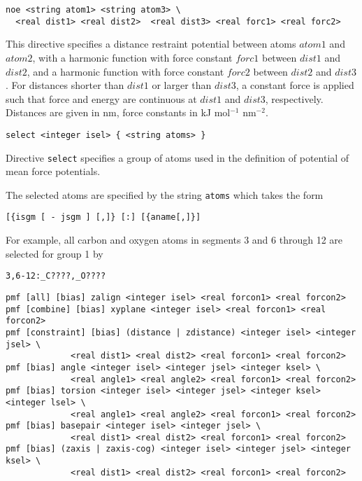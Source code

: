 \begin{verbatim}
noe <string atom1> <string atom3> \
  <real dist1> <real dist2>  <real dist3> <real forc1> <real forc2>
\end{verbatim}

This directive specifies a distance restraint potential between atoms
$atom1$ and $atom2$, with a harmonic function with force constant
$forc1$ between $dist1$ and $dist2$, and a harmonic function with 
force constant $forc2$ between $dist2$ and $dist3$. For distances
shorter than $dist1$ or larger than $dist3$, a constant force is 
applied such that force and energy are continuous at $dist1$
and $dist3$, respectively. Distances are given in nm, force constants
in kJ mol$^{-1}$ nm$^{-2}$.

\begin{verbatim}
select <integer isel> { <string atoms> }
\end{verbatim}

Directive \verb+select+ specifies a group of atoms used in the
definition of potential of mean force potentials.

The selected atoms are specified by the string \verb+atoms+ which
takes the form

\begin{verbatim}
[{isgm [ - jsgm ] [,]} [:] [{aname[,]}]
\end{verbatim}

For example, all carbon and oxygen atoms in segments 3
and 6 through 12 are selected for group 1 by

\begin{verbatim}
3,6-12:_C????,_O????
\end{verbatim}

\begin{verbatim}
pmf [all] [bias] zalign <integer isel> <real forcon1> <real forcon2> 
pmf [combine] [bias] xyplane <integer isel> <real forcon1> <real forcon2>
pmf [constraint] [bias] (distance | zdistance) <integer isel> <integer jsel> \
             <real dist1> <real dist2> <real forcon1> <real forcon2>
pmf [bias] angle <integer isel> <integer jsel> <integer ksel> \
             <real angle1> <real angle2> <real forcon1> <real forcon2>
pmf [bias] torsion <integer isel> <integer jsel> <integer ksel> <integer lsel> \
             <real angle1> <real angle2> <real forcon1> <real forcon2>
pmf [bias] basepair <integer isel> <integer jsel> \
             <real dist1> <real dist2> <real forcon1> <real forcon2>
pmf [bias] (zaxis | zaxis-cog) <integer isel> <integer jsel> <integer ksel> \
             <real dist1> <real dist2> <real forcon1> <real forcon2>
\end{verbatim}

